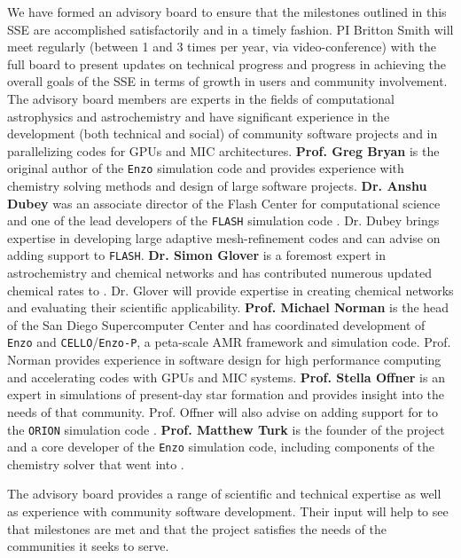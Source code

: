 We have formed an advisory board to ensure that the milestones
outlined in this SSE are accomplished satisfactorily and in a timely
fashion.  PI Britton Smith will meet regularly (between 1 and 3 times
per year, via video-conference) with the full board to present updates
on technical progress and progress in achieving the overall goals of
the SSE in terms of growth in users and community involvement.  The
advisory board members are experts in the fields of computational
astrophysics and astrochemistry and have significant experience in the
development (both technical and social) of community software projects
and in parallelizing codes for GPUs and MIC architectures.
{\bf Prof. Greg Bryan} is the original author of the \texttt{Enzo}
simulation code and provides experience with chemistry solving methods
and design of large software projects.
{\bf Dr. Anshu Dubey} was an associate director of the Flash Center
for computational science and one of the lead developers of the
\texttt{FLASH} simulation code \citep{2000ApJS..131..273F,
  2009arXiv0903.4875D}.  Dr. Dubey brings expertise in developing
large adaptive mesh-refinement codes and can advise on adding
\grackle{} support to \texttt{FLASH}.
{\bf Dr. Simon Glover} is a foremost expert in astrochemistry and
chemical networks and has contributed numerous updated chemical rates to
\grackle{}.  Dr. Glover will provide expertise in creating chemical
networks and evaluating their scientific applicability.
{\bf Prof. Michael Norman} is the head of the San Diego Supercomputer
Center and has coordinated development of \texttt{Enzo} and
\texttt{CELLO}/\texttt{Enzo-P}, a peta-scale AMR framework and
simulation code.  Prof. Norman provides experience in software design for
high performance computing and accelerating codes with GPUs and MIC
systems.
{\bf Prof. Stella Offner} is an expert in simulations of present-day
star formation and provides insight into the needs of that community.
Prof. Offner will also advise on adding support for \grackle{} to the
\texttt{ORION} simulation code \citep{2012ApJ...745..139L}.
{\bf Prof. Matthew Turk} is the founder of the \yt{} project and
a core developer of the \texttt{Enzo} simulation code, including
components of the chemistry solver that went into \grackle{}.

The advisory board provides a range of scientific and technical
expertise as well as experience with community software development.
Their input will help to see that milestones are met and that
the project satisfies the needs of the communities it seeks to serve.
